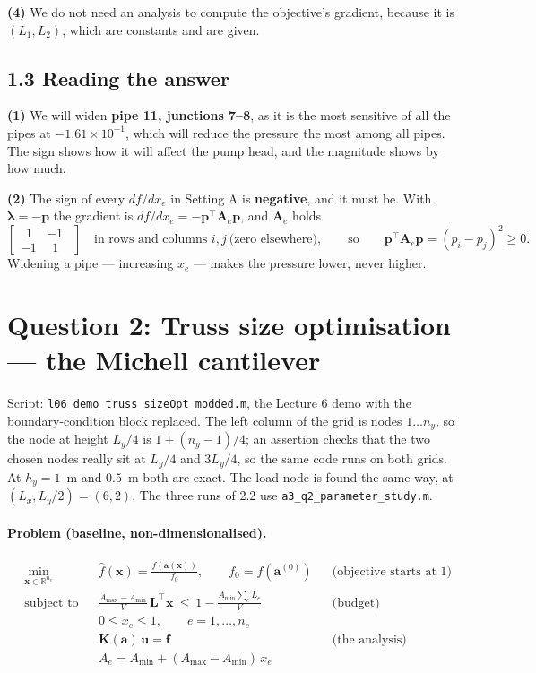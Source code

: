 \documentclass[11pt,a4paper]{article}
\begin{document}
\textbf{(4)} We do not need an analysis to compute the objective's gradient,
because it is $(L_1, L_2)$, which are constants and are given.

\subsection*{1.3 Reading the answer}

\textbf{(1)} We will widen \textbf{pipe 11, junctions 7--8}, as it is the most
sensitive of all the pipes at $-1.61\times10^{-1}$, which will reduce the
pressure the most among all pipes. The sign shows how it will affect the pump
head, and the magnitude shows by how much.

\textbf{(2)} The sign of every $df/dx_e$ in Setting A is \textbf{negative}, and it
must be. With $\bm{\lambda} = -\bm{p}$ the gradient is
$df/dx_e = -\bm{p}^\top\bm{A}_e\bm{p}$, and $\bm{A}_e$ holds
\[
  \begin{bmatrix} \ \ 1 & -1\ \ \\ -1 & \ \ 1\ \ \end{bmatrix}
  \quad\text{in rows and columns } i,j \ \text{(zero elsewhere)},
  \qquad\text{so}\qquad
  \bm{p}^\top\bm{A}_e\bm{p} = \left(p_i-p_j\right)^2 \ge 0 .
\]
Widening a pipe --- increasing $x_e$ --- makes the pressure lower, never higher.

\section*{Question 2: Truss size optimisation --- the Michell cantilever}

Script: \texttt{l06\_demo\_truss\_sizeOpt\_modded.m}, the Lecture 6 demo with the
boundary-condition block replaced. The left column of the grid is nodes
$1\ldots n_y$, so the node at height $L_y/4$ is $1+(n_y-1)/4$; an assertion
checks that the two chosen nodes really sit at $L_y/4$ and $3L_y/4$, so the same
code runs on both grids. At $h_y = 1$~m and $0.5$~m both are exact. The load
node is found the same way, at $(L_x, L_y/2) = (6,2)$. The three runs of 2.2 use
\texttt{a3\_q2\_parameter\_study.m}.

\paragraph*{Problem (baseline, non-dimensionalised).}
\[
  \begin{aligned}
    &\min_{\bm{x}\in\mathbb{R}^{n_e}}
      && \hat{f}(\bm{x}) = \frac{f(\bm{a}(\bm{x}))}{f_0},
         \qquad f_0 = f(\bm{a}^{(0)})
      && \text{(objective starts at 1)}\\[2pt]
    &\text{subject to}
      && \frac{A_{\max}-A_{\min}}{V}\,\bm{L}^\top\bm{x}
         \ \le\ 1 - \frac{A_{\min}\sum_e L_e}{V}
      && \text{(budget)}\\[2pt]
    & && 0 \le x_e \le 1, \qquad e = 1,\dots,n_e &&\\
    & && \bm{K}(\bm{a})\,\bm{u} = \bm{f} && \text{(the analysis)}\\
    & && A_e = A_{\min} + (A_{\max}-A_{\min})\,x_e &&
  \end{aligned}
\]
\end{document}
